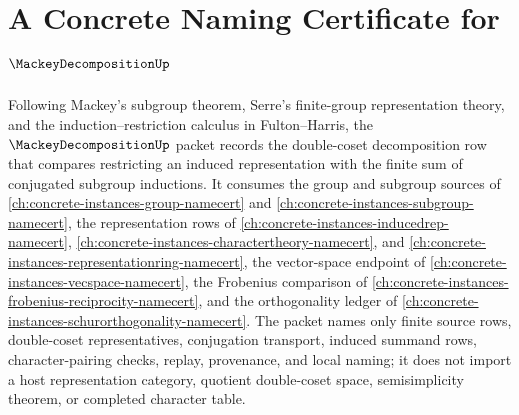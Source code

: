 \chapter{A Concrete Naming Certificate for $\MackeyDecompositionUp$}
\label{ch:concrete-instances-mackey-decomposition-namecert}

Following Mackey's subgroup theorem, Serre's finite-group representation theory, and the induction--restriction calculus in Fulton--Harris, the $\MackeyDecompositionUp$ packet records the double-coset decomposition row that compares restricting an induced representation with the finite sum of conjugated subgroup inductions. It consumes the group and subgroup sources of \autoref{ch:concrete-instances-group-namecert} and \autoref{ch:concrete-instances-subgroup-namecert}, the representation rows of \autoref{ch:concrete-instances-inducedrep-namecert}, \autoref{ch:concrete-instances-charactertheory-namecert}, and \autoref{ch:concrete-instances-representationring-namecert}, the vector-space endpoint of \autoref{ch:concrete-instances-vecspace-namecert}, the Frobenius comparison of \autoref{ch:concrete-instances-frobenius-reciprocity-namecert}, and the orthogonality ledger of \autoref{ch:concrete-instances-schurorthogonality-namecert}. The packet names only finite source rows, double-coset representatives, conjugation transport, induced summand rows, character-pairing checks, replay, provenance, and local naming; it does not import a host representation category, quotient double-coset space, semisimplicity theorem, or completed character table.

